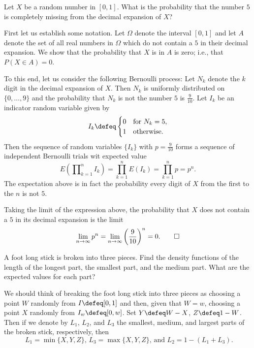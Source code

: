 \begin{problem}[Handout 18, \# 16]
  Let \(X\) be a random number in \([0,1]\). What is the probability that
  the number \(5\) is completely missing from the decimal expansion of
  \(X\)?
\end{problem}
\begin{solution}
  First let us establish some notation. Let \(\Omega\) denote the interval
  \([0,1]\) and let \(A\) denote the set of all real numbers in \(\Omega\)
  which do not contain a \(5\) in their decimal expansion. We show that the
  probability that \(X\) is in \(A\) is zero; i.e., that \(P(X\in A)=0\).

  To this end, let us consider the following Bernoulli process: Let \(N_k\)
  denote the \(k\) digit in the decimal expansion of
  \(X\). Then \(N_k\) is uniformly distributed on \(\{0,\dotsc,9\}\) and
  the probability that \(N_k\) is not the number \(5\) is
  \(\frac{9}{10}\). Let \(I_k\) be an indicator random variable given by
  \[
    I_k\defeq%
    \begin{cases}%
      0&\text{for \(N_k=5\),}\\
      1&\text{otherwise.}
    \end{cases}
  \]
  Then the sequence of random variables \(\{I_k\}\) with \(p=\frac{9}{10}\)
  forms a sequence of independent Bernoulli trials wit expected value
  \[
    E\left(\prod\nolimits_{k=1}^n I_k\right)=%
    \prod_{k=1}^n E(I_k)=%
    \prod_{k=1}^n p=p^n.
  \]
  The expectation above is in fact the probability every digit of \(X\)
  from the first to the \(n\) is not \(5\).

  Taking the limit of the expression above, the probability that \(X\) does
  not contain a \(5\) in its decimal expansion is the limit
  \[
    \lim_{n\to\infty}
    p^n=\lim_{n\to\infty}\left(\frac{9}{10}\right)^n=0.\qedhere
  \]
\end{solution}
\newpage

\begin{problem}[Handout 18, \# 17]
  A foot long stick is broken into three pieces. Find the density functions
  of the length of the longest part, the smallest part, and the medium
  part. What are the expected values for each part?
\end{problem}
\begin{solution}
  We should think of breaking the foot long stick into three pieces as
  choosing a point \(W\) randomly from \(I\defeq [0,1]\) and then, given
  that \(W=w\), choosing a point \(X\) randomly from \(I_w\defeq
  [0,w]\). Set \(Y\defeq W-X\), \(Z\defeq 1-W\). Then if we denote by
  \(L_1\), \(L_2\), and \(L_3\) the smallest, medium, and largest parts of
  the broken stick, respectively, then
  \[
    \text{
    \(L_1=\min\{X,Y,Z\}\),
    \(L_3=\max\{X,Y,Z\}\), and \(L_2=1-(L_1+L_3)\).}
  \]
\end{solution}


